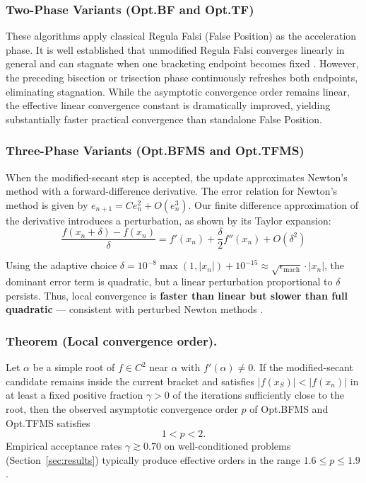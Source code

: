 \documentclass[amsmath, amssymb, aps]{revtex4-2}
\begin{document}
\subsubsection{Two-Phase Variants (Opt.BF and Opt.TF)}

These algorithms apply classical Regula Falsi (False Position) as the acceleration phase. It is well established that unmodified Regula Falsi converges linearly in general and can stagnate when one bracketing endpoint becomes fixed \cite{burden2016numerical}. However, the preceding bisection or trisection phase continuously refreshes both endpoints, eliminating stagnation. While the asymptotic convergence order remains linear, the effective linear convergence constant is dramatically improved, yielding substantially faster practical convergence than standalone False Position.

\subsubsection{Three-Phase Variants (Opt.BFMS and Opt.TFMS)}

When the modified-secant step is accepted, the update approximates Newton’s method with a forward-difference derivative. The error relation for Newton's method is given by $e_{n+1} = C e_n^2 + O(e_n^3)$. Our finite difference approximation of the derivative introduces a perturbation, as shown by its Taylor expansion:
$$  
    \frac{f(x_n+\delta) - f(x_n)}{\delta} = f'(x_n) + \frac{\delta}{2}f''(x_n) + O(\delta^2)
$$

Using the adaptive choice $\delta = 10^{-8} \max(1, |x_n|) + 10^{-15} \approx \sqrt{\epsilon_{\text{mach}}} \cdot |x_n|$, the dominant error term is quadratic, but a linear perturbation proportional to $\delta$ persists. Thus, local convergence is \textbf{faster than linear but slower than full quadratic} — consistent with perturbed Newton methods \cite{kelley1995iterative}.

\subsubsection{Theorem (Local convergence order).}
Let \(\alpha\) be a simple root of \(f \in C^2\) near \(\alpha\) with \(f'(\alpha) \neq 0\). If the modified-secant candidate remains inside the current bracket and satisfies \(|f(x_S)| < |f(x_n)|\) in at least a fixed positive fraction \(\gamma > 0\) of the iterations sufficiently close to the root, then the observed asymptotic convergence order \(p\) of Opt.BFMS and Opt.TFMS satisfies
\[
1 < p < 2.
\]
Empirical acceptance rates \(\gamma \gtrsim 0.70\) on well-conditioned problems (Section~\ref{sec:results}) typically produce effective orders in the range \(1.6 \leq p \leq 1.9\).
\end{document}
